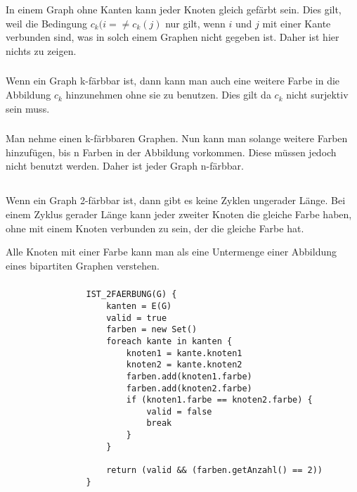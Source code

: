 \documentclass[10pt,a4paper,oneside,ngerman,numbers=noenddot]{scrartcl}
\begin{document}
\section{} %
	\subsection{} %
		\subsubsection{} %
			In einem Graph ohne Kanten kann jeder Knoten gleich gefärbt sein. Dies gilt, weil die Bedingung $c_{k}(i= \neq c_{k}(j)$ nur gilt, wenn $i$ und $j$ mit einer Kante verbunden sind, was in solch einem Graphen nicht gegeben ist. Daher ist hier nichts zu zeigen.
		\subsubsection{} %
			Wenn ein Graph k-färbbar ist, dann kann man auch eine weitere Farbe in die Abbildung $c_{k}$ hinzunehmen ohne sie zu benutzen. Dies gilt da $c_{k}$ nicht surjektiv sein muss.
		\subsubsection{} %
			Man nehme einen k-färbbaren Graphen. Nun kann man solange weitere Farben hinzufügen, bis n Farben in der Abbildung vorkommen. Diese müssen jedoch nicht benutzt werden. Daher ist jeder Graph n-färbbar.
	\subsection{} %
		\subsubsection{} %
			Wenn ein Graph 2-färbbar ist, dann gibt es keine Zyklen ungerader Länge. Bei einem Zyklus gerader Länge kann jeder zweiter Knoten die gleiche Farbe haben, ohne mit einem Knoten verbunden zu sein, der die gleiche Farbe hat.
			
			Alle Knoten mit einer Farbe kann man als eine Untermenge einer Abbildung eines bipartiten Graphen verstehen.
		\subsubsection{} %
			\begin{verbatim}
			    IST_2FAERBUNG(G) {
			        kanten = E(G)
			        valid = true
			        farben = new Set()
			        foreach kante in kanten {
			            knoten1 = kante.knoten1
			            knoten2 = kante.knoten2
			            farben.add(knoten1.farbe)
			            farben.add(knoten2.farbe)
			            if (knoten1.farbe == knoten2.farbe) {
			                valid = false
			                break
			            }
			        }
			        
			        return (valid && (farben.getAnzahl() == 2))
			    }
			\end{verbatim}
\end{document}
